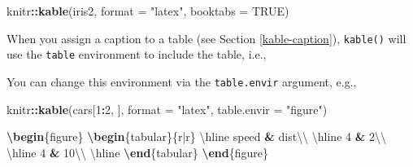 \documentclass[
  11pt,
]{krantz}
\newenvironment{Shaded}{\begin{snugshade}}{\end{snugshade}}
\newcommand{\CommentTok}[1]{\textcolor[rgb]{0.37,0.37,0.37}{\textit{#1}}}
\newcommand{\DataTypeTok}[1]{\textcolor[rgb]{0.27,0.27,0.27}{#1}}
\newcommand{\DecValTok}[1]{\textcolor[rgb]{0.06,0.06,0.06}{#1}}
\newcommand{\ExtensionTok}[1]{#1}
\newcommand{\FunctionTok}[1]{\textcolor[rgb]{0,0,0}{#1}}
\newcommand{\KeywordTok}[1]{\textcolor[rgb]{0.27,0.27,0.27}{\textbf{#1}}}
\newcommand{\NormalTok}[1]{#1}
\newcommand{\OperatorTok}[1]{\textcolor[rgb]{0.43,0.43,0.43}{\textbf{#1}}}
\newcommand{\OtherTok}[1]{\textcolor[rgb]{0.37,0.37,0.37}{#1}}
\newcommand{\StringTok}[1]{\textcolor[rgb]{0.5,0.5,0.5}{#1}}
\begin{document}
\begin{Shaded}
\begin{Highlighting}[]
\NormalTok{knitr}\OperatorTok{::}\KeywordTok{kable}\NormalTok{(iris2, }\DataTypeTok{format =} \StringTok{"latex"}\NormalTok{, }\DataTypeTok{booktabs =} \OtherTok{TRUE}\NormalTok{)}
\end{Highlighting}
\end{Shaded}

When you assign a caption to a table (see Section \ref{kable-caption}), \texttt{kable()} will use the \texttt{table} environment to include the table, i.e.,

\begin{Shaded}
\end{Shaded}

You can change this environment via the \texttt{table.envir} argument, e.g.,

\begin{Shaded}
\begin{Highlighting}[]
\NormalTok{knitr}\OperatorTok{::}\KeywordTok{kable}\NormalTok{(cars[}\DecValTok{1}\OperatorTok{:}\DecValTok{2}\NormalTok{, ], }\DataTypeTok{format =} \StringTok{"latex"}\NormalTok{, }\DataTypeTok{table.envir =} \StringTok{"figure"}\NormalTok{)}
\end{Highlighting}
\end{Shaded}

\begin{Shaded}
\begin{Highlighting}[]
\KeywordTok{\textbackslash{}begin}\NormalTok{\{}\ExtensionTok{figure}\NormalTok{\}}
\KeywordTok{\textbackslash{}begin}\NormalTok{\{}\ExtensionTok{tabular}\NormalTok{\}\{r|r\}}
\FunctionTok{\textbackslash{}hline}
\NormalTok{speed }\OperatorTok{&}\NormalTok{ dist}\FunctionTok{\textbackslash{}\textbackslash{}}
\FunctionTok{\textbackslash{}hline}
\NormalTok{4 }\OperatorTok{&}\NormalTok{ 2}\FunctionTok{\textbackslash{}\textbackslash{}}
\FunctionTok{\textbackslash{}hline}
\NormalTok{4 }\OperatorTok{&}\NormalTok{ 10}\FunctionTok{\textbackslash{}\textbackslash{}}
\FunctionTok{\textbackslash{}hline}
\KeywordTok{\textbackslash{}end}\NormalTok{\{}\ExtensionTok{tabular}\NormalTok{\}}
\KeywordTok{\textbackslash{}end}\NormalTok{\{}\ExtensionTok{figure}\NormalTok{\}}
\end{Highlighting}
\end{Shaded}
\end{document}
